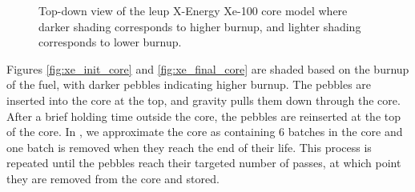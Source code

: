 \begin{figure}[H]
    \hfill
    \caption{Top-down view of the \gls{leup} X-Energy Xe-100 core model where darker shading corresponds to higher burnup, and lighter shading corresponds to lower burnup.}
    \label{fig:xe_core}
  \end{figure}

Figures \ref{fig:xe_init_core} and \ref{fig:xe_final_core} are shaded based on the burnup of the fuel, with darker pebbles indicating higher burnup. The pebbles are inserted into the core at the top, and gravity pulls them down through the core. After a brief holding time outside the core, the pebbles are reinserted at the top of the core. In \cyclus, we approximate the core as containing 6 batches in the core and one batch is removed when they reach the end of their life. This process is repeated until the pebbles reach their targeted number of passes, at which point they are removed from the core and stored.

